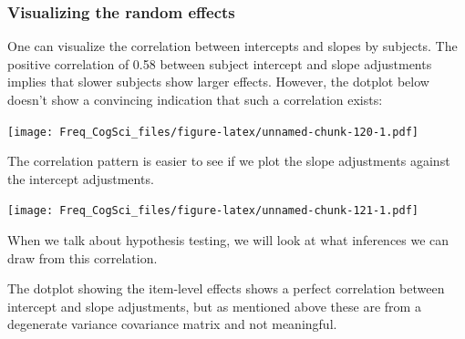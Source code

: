 \documentclass[12pt,]{krantz}
\newenvironment{Shaded}{\begin{snugshade}}{\end{snugshade}}
\newcommand{\DataTypeTok}[1]{\textcolor[rgb]{0.13,0.29,0.53}{#1}}
\newcommand{\DecValTok}[1]{\textcolor[rgb]{0.00,0.00,0.81}{#1}}
\newcommand{\KeywordTok}[1]{\textcolor[rgb]{0.13,0.29,0.53}{\textbf{#1}}}
\newcommand{\NormalTok}[1]{#1}
\newcommand{\OperatorTok}[1]{\textcolor[rgb]{0.81,0.36,0.00}{\textbf{#1}}}
\newcommand{\OtherTok}[1]{\textcolor[rgb]{0.56,0.35,0.01}{#1}}
\newcommand{\StringTok}[1]{\textcolor[rgb]{0.31,0.60,0.02}{#1}}
\begin{document}
\hypertarget{visualizing-the-random-effects}{%
\subsubsection{Visualizing the random effects}\label{visualizing-the-random-effects}}

One can visualize the correlation between intercepts and slopes by subjects. The positive correlation of 0.58 between subject intercept and slope adjustments implies that slower subjects show larger effects. However, the dotplot below doesn't show a convincing indication that such a correlation exists:

\begin{Shaded}
\end{Shaded}

\texttt{[image: Freq\_CogSci\_files/figure-latex/unnamed-chunk-120-1.pdf]}

The correlation pattern is easier to see if we plot the slope adjustments against the intercept adjustments.

\begin{Shaded}
\end{Shaded}

\texttt{[image: Freq\_CogSci\_files/figure-latex/unnamed-chunk-121-1.pdf]}

When we talk about hypothesis testing, we will look at what inferences we can draw from this correlation.

The dotplot showing the item-level effects shows a perfect correlation between intercept and slope adjustments, but as mentioned above these are from a degenerate variance covariance matrix and not meaningful.

\begin{Shaded}
\end{Shaded}
\end{document}
